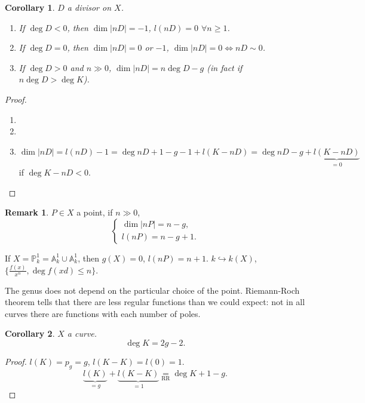 \documentclass[12pt]{article}
\newtheorem*{corollary}{Corollary}
\theoremstyle{definition}
\newtheorem*{remark}{Remark}
\begin{document}
\begin{corollary}
$D$ a divisor on $X$.

\begin{enumerate}[label=\arabic*)]
\item If $\deg D<0$, then $\dim|nD|=-1$, $l(nD)=0$ $\forall n\geq1$.

\item If $\deg D=0$, then $\dim|nD|=0$ or $-1$, $\dim|nD|=0\Leftrightarrow nD\sim0$.

\item If $\deg D>0$ and $n\gg0$, $\dim|nD|=n\deg D-g$ (in fact if $n\deg D>\deg K$).
\end{enumerate}
\end{corollary}

\begin{proof}
\begin{enumerate}[label=\arabic*)]
\item \checkmark

\item \checkmark

\item
\[\dim|nD|=l(nD)-1=\deg nD+1-g-1+l(K-nD)=\deg nD-g+\underbrace{l(K-nD)}_{=0}\]
if $\deg K-nD<0$.
\end{enumerate}
\end{proof}

\begin{remark}
$P\in X$ a point, if $n\gg0$,
\[\left\{\begin{array}{l}\dim|nP|=n-g,\\l(nP)=n-g+1.\end{array}\right.\]
\end{remark}

If $X=\mathbb{P}_k^1=\mathbb{A}_k^1\cup\mathbb{A}_k^1$, then $g(X)=0$, $l(nP)=n+1$. $k\hookrightarrow k(X)$, $\{\frac{f(x)}{x^n},\deg f(xd)\leq n\}$.

The genus does not depend on the particular choice of the point. Riemann-Roch theorem tells that there are less regular functions than we could expect: not in all curves there are functions with each number of poles.

\begin{corollary}
$X$ a curve.
\[\deg K=2g-2.\]
\end{corollary}

\begin{proof}
$l(K)=p_g=g$, $l(K-K)=l(0)=1$.
\[\underbrace{l(K)}_{=g}+\underbrace{l(K-K)}_{=1}\underset{\text{RR}}{=}\deg K+1-g.\]
\end{proof}
\end{document}
